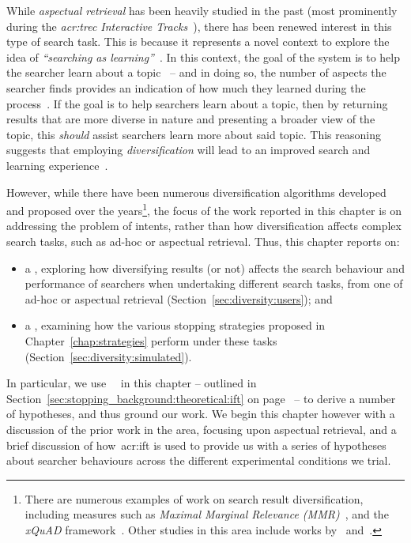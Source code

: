 While \emph{aspectual retrieval} has been heavily studied in the past (most prominently during the \emph{\gls{acr:trec} Interactive Tracks}~\citep{over2001trec}), there has been renewed interest in this type of search task. This is because it represents a novel context to explore the idea of \emph{``searching as learning''}~\citep{collins2017sal}. In this context, the goal of the system is to help the searcher learn about a topic~\citep{collins2017sal} -- and in doing so, the number of aspects the searcher finds provides an indication of how much they learned during the process~\citep{syed2017sal}. If the goal is to help searchers learn about a topic, then by returning results that are more diverse in nature and presenting a broader view of the topic, this \emph{should} assist searchers learn more about said topic. This reasoning suggests that employing \emph{diversification} will lead to an improved search and learning experience~\citep{syed2017sal}.

However, while there have been numerous diversification algorithms developed and proposed over the years\footnote{There are numerous examples of work on search result diversification, including measures such as \emph{Maximal Marginal Relevance (MMR)}~\citep{carbonell1998mmr}, and the \emph{xQuAD} framework~\citep{santos2010query_reformulations_diversification, santos2011intent}. Other studies in this area include works by~\cite{chen2006probabilistic_models} and~\cite{zhai2015subtopics}.}, the focus of the work reported in this chapter is on addressing the problem of intents, rather than how diversification affects complex search tasks, such as ad-hoc or aspectual retrieval. Thus, this chapter reports on:

\begin{itemize}
    \item{a , exploring how diversifying results (or not) affects the search behaviour and performance of searchers when undertaking different search tasks, from one of ad-hoc or aspectual retrieval (Section~\ref{sec:diversity:users}); and}
    \item{a , examining how the various stopping strategies proposed in Chapter~\ref{chap:strategies} perform under these tasks (Section~\ref{sec:diversity:simulated}).}
\end{itemize}

In particular, we use~~\citep{pirolli1999ift} in this chapter -- outlined in Section~\ref{sec:stopping_background:theoretical:ift} on page~\pageref{sec:stopping_background:theoretical:ift} -- to derive a number of hypotheses, and thus ground our work. We begin this chapter however with a discussion of the prior work in the area, focusing upon aspectual retrieval, and a brief discussion of how~\gls{acr:ift} is used to provide us with a series of hypotheses about searcher behaviours across the different experimental conditions we trial.

